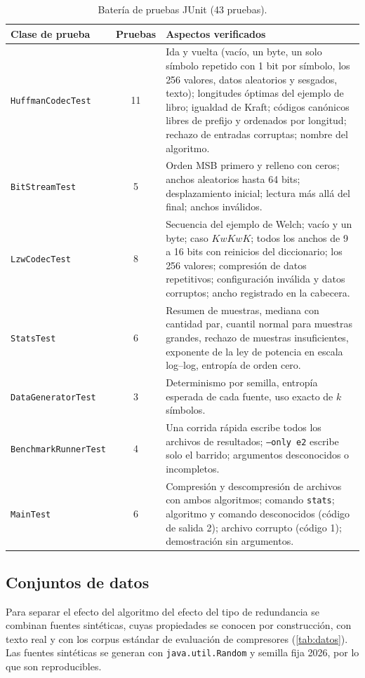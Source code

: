 \begin{table}[H]
  \centering
  \caption{Batería de pruebas JUnit (43 pruebas).}
  \label{tab:pruebas}
  \small
  \begin{tabular}{@{}l c p{9.4cm}@{}}
    \toprule
    Clase de prueba & Pruebas & Aspectos verificados \\
    \midrule
    \texttt{HuffmanCodecTest} & 11 & Ida y vuelta (vacío, un byte, un solo símbolo repetido con 1 bit por símbolo, los 256 valores, datos aleatorios y sesgados, texto); longitudes óptimas del ejemplo de libro; igualdad de Kraft; códigos canónicos libres de prefijo y ordenados por longitud; rechazo de entradas corruptas; nombre del algoritmo. \\
    \texttt{BitStreamTest} & 5 & Orden MSB primero y relleno con ceros; anchos aleatorios hasta 64 bits; desplazamiento inicial; lectura más allá del final; anchos inválidos. \\
    \texttt{LzwCodecTest} & 8 & Secuencia del ejemplo de Welch; vacío y un byte; caso $KwKwK$; todos los anchos de 9 a 16 bits con reinicios del diccionario; los 256 valores; compresión de datos repetitivos; configuración inválida y datos corruptos; ancho registrado en la cabecera. \\
    \texttt{StatsTest} & 6 & Resumen de muestras, mediana con cantidad par, cuantil normal para muestras grandes, rechazo de muestras insuficientes, exponente de la ley de potencia en escala log--log, entropía de orden cero. \\
    \texttt{DataGeneratorTest} & 3 & Determinismo por semilla, entropía esperada de cada fuente, uso exacto de $k$ símbolos. \\
    \texttt{BenchmarkRunnerTest} & 4 & Una corrida rápida escribe todos los archivos de resultados; \texttt{--only e2} escribe solo el barrido; argumentos desconocidos o incompletos. \\
    \texttt{MainTest} & 6 & Compresión y descompresión de archivos con ambos algoritmos; comando \texttt{stats}; algoritmo y comando desconocidos (código de salida 2); archivo corrupto (código 1); demostración sin argumentos. \\
    \bottomrule
  \end{tabular}
\end{table}

\subsection{Conjuntos de datos}
\label{sec:datos}
Para separar el efecto del algoritmo del efecto del tipo de redundancia se combinan fuentes
sintéticas, cuyas propiedades se conocen por construcción, con texto real y con los corpus
estándar de evaluación de compresores (\cref{tab:datos}). Las fuentes sintéticas se generan
con \texttt{java.util.Random} y semilla fija 2026, por lo que son reproducibles.


